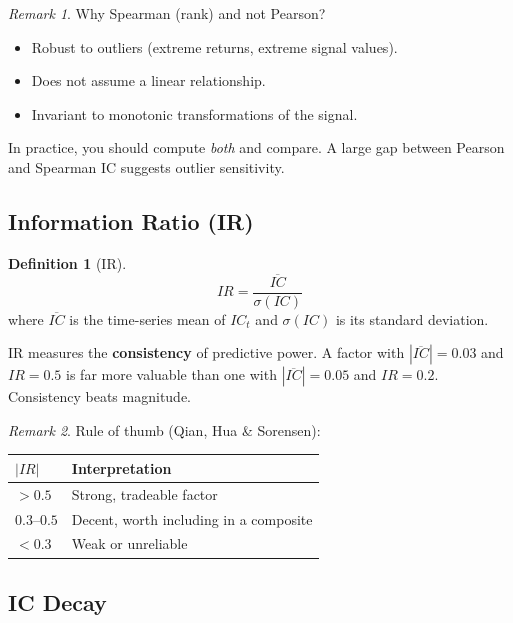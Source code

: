 \documentclass[a4paper, 11pt]{report}
\theoremstyle{definition}
\newtheorem{definition}{Definition}[chapter]
\theoremstyle{remark}
\newtheorem{remark}{Remark}[chapter]
\begin{document}
\begin{remark}
    Why Spearman (rank) and not Pearson?
    \begin{itemize}
        \item Robust to outliers (extreme returns, extreme signal values).
        \item Does not assume a linear relationship.
        \item Invariant to monotonic transformations of the signal.
    \end{itemize}
    In practice, you should compute \emph{both} and compare.  A large gap
    between Pearson and Spearman IC suggests outlier sensitivity.
\end{remark}

\subsection{Information Ratio (IR)}

\begin{definition}[IR]
    \[
        IR = \frac{\overline{IC}}{\sigma(IC)}
    \]
    where $\overline{IC}$ is the time-series mean of $IC_t$ and $\sigma(IC)$ is
    its standard deviation.

    IR measures the \textbf{consistency} of predictive power.  A factor with
    $|\overline{IC}| = 0.03$ and $IR = 0.5$ is far more valuable than one with
    $|\overline{IC}| = 0.05$ and $IR = 0.2$.  Consistency beats magnitude.
\end{definition}

\begin{remark}
    Rule of thumb (Qian, Hua \& Sorensen):
    \begin{center}
    \begin{tabular}{@{}ll@{}}
    \toprule
    $|IR|$ & Interpretation \\
    \midrule
    $> 0.5$       & Strong, tradeable factor \\
    $0.3$--$0.5$  & Decent, worth including in a composite \\
    $< 0.3$       & Weak or unreliable \\
    \bottomrule
    \end{tabular}
    \end{center}
\end{remark}

\subsection{IC Decay}
\end{document}
